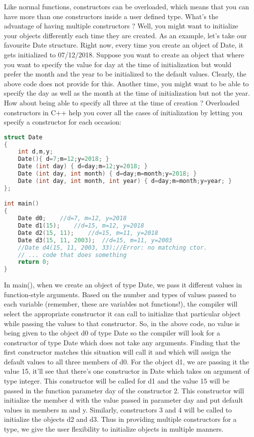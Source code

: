 \documentclass[11pt,fleqn]{book} %
\begin{document}
Like normal functions, constructors can be overloaded, which means that you can have more than one constructors inside a user defined type. What's the advantage of having multiple constructors ? Well, you might want to initialize your objects differently each time they are created. As an example, let's take our favourite Date structure. Right now, every time you create an object of Date, it gets initialized to 07/12/2018. Suppose you want to create an object that where you want to specify the value for day at the time of initialization but would prefer the month and the year to be initialized to the default values. Clearly, the above code does not provide for this. Another time, you might want to be able to specify the day as well as the month at the time of initialization but not the year. How about being able to specify all three at the time of creation ? Overloaded constructors in C++ help you cover all the cases of initialization by letting you specify a constructor for each occasion:
\begin{lstlisting}[language=C++, caption = Overloaded constructors]
struct Date 
{
	int d,m,y;
	Date(){ d=7;m=12;y=2018; } 
	Date (int day) { d=day;m=12;y=2018; } 
	Date (int day, int month) { d=day;m=month;y=2018; } 
	Date (int day, int month, int year) { d=day;m=month;y=year; } 
};

int main()
{
	Date d0;	//d=7, m=12, y=2018
	Date d1(15);	//d=15, m=12, y=2018
	Date d2(15, 11);	//d=15, m=11, y=2018
	Date d3(15, 11, 2003);	//d=15, m=11, y=2003
	//Date d4(15, 11, 2003, 33);//Error: no matching ctor.
	// ... code that does something
	return 0;
}
\end{lstlisting}

\noindent In main(), when we create an object of type Date, we pass it different values in function-style arguments. Based on the number and types of values passed to each variable (remember, these are variables not functions!), the compiler will select the appropriate constructor it can call to initialize that particular object while passing the values to that constructor. So, in the above code, no value is being given to the object d0 of type Date so the compiler will look for a constructor of type Date which does not take any arguments. Finding that the first constructor matches this situation will call it and which will assign the default values to all three members of d0. For the object d1, we are passing it the value 15, it'll see that there's one constructor in Date which takes on argument of type integer. This constructor will be called for d1 and the value 15 will be passed in the function parameter day of the constructor 2. This constructor will initialize the member d with the value passed in parameter day and put default values in members m and y. Similarly, constructors 3 and 4 will be called to initialize the objects d2 and d3. Thus in providing multiple constructors for a type, we give the user flexibility to initialize objects in multiple manners.
\end{document}
